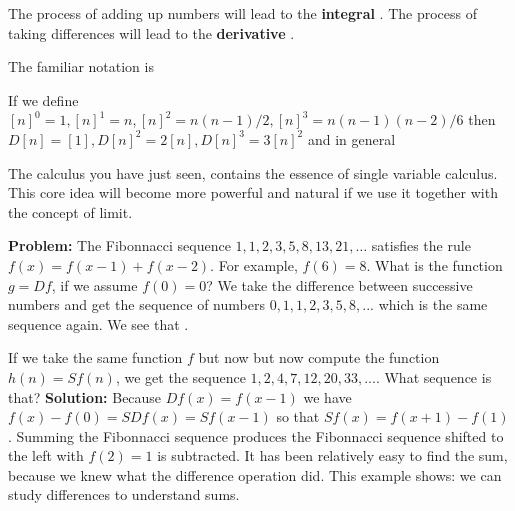 \documentclass[12pt]{amsart}
\newcounter{example}    \def\example#1{ \item \fontsize{12}{15} \selectfont #1 \fontsize{12}{15} \selectfont }
\begin{document}
The process of adding up numbers will lead to the {\bf integral} .
The process of taking differences will lead to the {\bf derivative} . 

The familiar notation is

\begin{center}
\end{center}

If we define $[n]^0 = 1, [n]^1=n, [n]^2 = n(n-1)/2, [n]^3 = n (n-1)(n-2)/6$
then $D[n]=[1], D[n]^2 = 2 [n], D[n]^3 = 3 [n]^2$ and in general
\begin{center}  \end{center}
The calculus you have just seen, contains the essence of single variable calculus. This core idea will become more
powerful and natural if we use it together with the concept of limit. 

{\bf Problem:} The Fibonnacci sequence $1,1,2,3,5,8,13,21, \dots$ satisfies the rule $f(x)=f(x-1)+f(x-2)$. 
For example, $f(6) = 8$. What is the function $g=Df$, if we assume $f(0)=0$? 
We take the difference between successive numbers and get the sequence of numbers 
$0,1,1,2,3,5,8, ... $ which is the same sequence again. We see that . 

If we take the same function $f$ but now but now compute the function $h(n) = Sf(n)$, we get the sequence
$1,2,4,7,12,20,33, ...$. What sequence is that? 
{\bf Solution:} Because $Df(x)=f(x-1)$ we have $f(x)-f(0) = S D f(x) = S f(x-1)$ so that $S f(x)=f(x+1)-f(1)$. 
Summing the Fibonnacci sequence produces the Fibonnacci sequence shifted to the left with $f(2)=1$ is subtracted.
It has been relatively easy to find the sum, because we knew what the difference operation did. This example shows:
we can study differences to understand sums. 

\begin{comment}
 M=11; f0[n_]:=n^2+n; Di[f_]:=Function[m,f[m]-f[m-1]];
 Diff[f_,k_]:=Module[{g,h},h=f; Do[g=Di[h]; h=g,{j,k}];h];
 A=Table[Table[Diff[f0,j][i],{i,1,M}],{j,0,5}]; TeXForm[A]
(* *) 
 M=12; f0[n_]:=n^2+n; Di[f_]:=Function[m,f[m]-f[m-1]];
 Diff[f_,k_]:=Module[{g,h},h=f; Do[g=Di[h]; h=g,{j,k}];h];
 A=Table[Table[Diff[f0,j][i],{i,1,M}],{j,0,5}]; TeXForm[A]
\end{comment}
\end{document}
